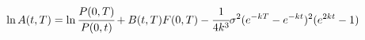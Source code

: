 \[\ln A(t,T)=\ln\cfrac{P(0,T)}{P(0,t)}+B(t,T)F(0,T)-\cfrac{1}{4k^3}\sigma^{2}(e^{-kT}-e^{-kt})^2(e^{2kt}-1)\]

